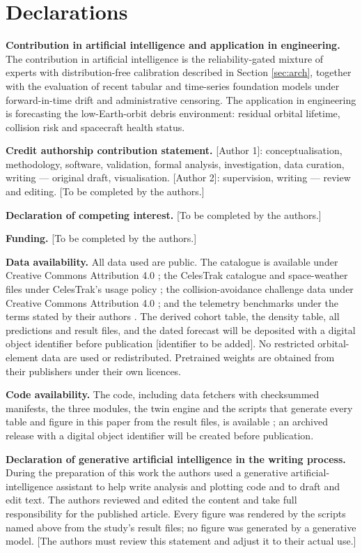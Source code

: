 \documentclass[3p,times,twocolumn]{elsarticle}
\begin{document}
\section*{Declarations}\label{declarations}

\textbf{Contribution in artificial intelligence and application in
engineering.} The contribution in artificial intelligence is the
reliability-gated mixture of experts with distribution-free calibration
described in Section \ref{sec:arch}, together with the evaluation of
recent tabular and time-series foundation models under forward-in-time
drift and administrative censoring. The application in engineering is
forecasting the low-Earth-orbit debris environment: residual orbital
lifetime, collision risk and spacecraft health status.

\textbf{Credit authorship contribution statement.} {[}Author 1{]}:
conceptualisation, methodology, software, validation, formal analysis,
investigation, data curation, writing --- original draft, visualisation.
{[}Author 2{]}: supervision, writing --- review and editing. {[}To be
completed by the authors.{]}

\textbf{Declaration of competing interest.} {[}To be completed by the
authors.{]}

\textbf{Funding.} {[}To be completed by the authors.{]}

\textbf{Data availability.} All data used are public. The catalogue is
available under Creative Commons Attribution 4.0
\citep{mcdowell2020gcat}; the CelesTrak catalogue and space-weather
files under CelesTrak's usage policy \citep{celestrak2026satcat}; the
collision-avoidance challenge data under Creative Commons Attribution
4.0 \citep{uriot2021cacdataset}; and the telemetry benchmarks under the
terms stated by their authors \citep{hundman2018, esaadb_dataset}. The
derived cohort table, the density table, all predictions and result
files, and the dated forecast will be deposited with a digital object
identifier before publication {[}identifier to be added{]}. No
restricted orbital-element data are used or redistributed. Pretrained
weights are obtained from their publishers under their own licences.

\textbf{Code availability.} The code, including data fetchers with
checksummed manifests, the three modules, the twin engine and the
scripts that generate every table and figure in this paper from the
result files, is available \citep{cosmos_software}; an archived release
with a digital object identifier will be created before publication.

\textbf{Declaration of generative artificial intelligence in the writing
process.} During the preparation of this work the authors used a
generative artificial-intelligence assistant to help write analysis and
plotting code and to draft and edit text. The authors reviewed and
edited the content and take full responsibility for the published
article. Every figure was rendered by the scripts named above from the
study's result files; no figure was generated by a generative model.
{[}The authors must review this statement and adjust it to their actual
use.{]}



\end{document}

